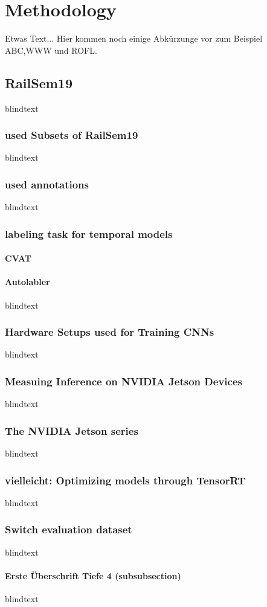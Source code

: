 \chapter{Methodology}
\label{sec:methodology}
Etwas Text... Hier kommen noch einige Abkürzunge vor zum Beispiel \ac{ABC},\ac{WWW} und \ac{ROFL}.

\section{RailSem19}
blindtext

\subsection{used Subsets of RailSem19}
blindtext

\subsection{used annotations}
blindtext

\subsection{labeling task for temporal models}

\subsubsection{CVAT}
\subsubsection{Autolabler}
blindtext

\subsection{Hardware Setups used for Training CNNs}
blindtext

\subsection{Measuing Inference on NVIDIA Jetson Devices}
blindtext

\subsection{The NVIDIA Jetson series}
blindtext

\subsection{vielleicht: Optimizing models through TensorRT}
blindtext

\subsection{Switch evaluation dataset}
blindtext

\subsubsection{Erste Überschrift Tiefe 4 (subsubsection)}
blindtext
